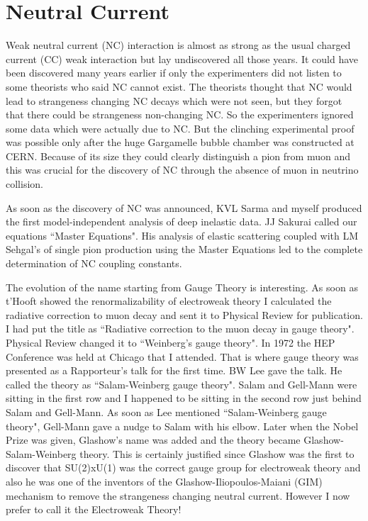 \section*{Neutral Current}
Weak neutral current (NC) interaction is almost as strong as the usual 
charged current (CC) weak interaction but lay undisco\-vered all those 
years. It could have been discovered many years earlier if only the 
experimenters did not listen to some theorists who said NC cannot exist. 
The theorists thought that NC would lead to strangeness changing NC 
decays which were not seen, but they forgot that there could be 
strangeness non-changing NC. So the experimenters ignored some data which 
were actually due to NC. But the clinching experimental proof was 
possible only after the huge Gargamelle bubble chamber was constructed 
at CERN. Because of its size they could clearly distinguish a pion 
from muon and this was crucial for the discovery of NC through the 
absence of muon in neutrino collision.

\smallskip
As soon as the discovery of NC was announced, KVL Sarma and myself 
produced the first model-independent analysis of de\-ep inelastic data. JJ 
Sakurai called our equations ``Master Equations". His analysis of elastic 
scattering coupled with LM Sehgal's of single pion production using the 
Master Equations led to the complete determination of NC coupling 
constants.


The evolution of the name starting from Gauge Theory is inte\-resting. As 
soon as t'Hooft showed the renormalizability of electroweak theory I 
calculated the radiative correction to muon decay and sent it to 
Physical Review for publication. I had put the title as ``Radiative 
correction to the muon decay in gauge theory". Physical Review changed 
it to ``Weinberg's gauge theory". In 1972 the HEP Conference was held at 
Chicago that I atten\-ded. That is where gauge theory was presented as a 
Rappor\-teur's talk for the first time. BW Lee gave the talk. He called 
the theory as ``Salam-Weinberg gauge theory". Salam and Gell-Mann were 
sitting in the first row and I happened to be sitting in the second row 
just behind Salam and Gell-Mann. As soon as Lee mentioned 
``Salam-Weinberg gauge theory", Gell-Mann gave a nudge to Salam with his 
elbow. Later when the Nobel Prize was given, Glashow's name was added 
and the theory beca\-me Glashow-Salam-Weinberg theory. This is certainly 
justi\-fied since Glashow was the first to discover that SU(2)xU(1) was 
the correct gauge group for electroweak theory and also he was one of 
the inventors of the Glashow-Iliopoulos-Maiani (GIM) mechanism to remove 
the strangeness changing neutral current. However I now prefer to call 
it the Electroweak Theory!
\vspace{-\topsep}
